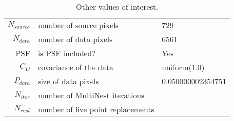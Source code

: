 \begin{table*}[!htb]\caption{Other values of interest.}\begin{center}\begin{tabular}{ r l l }\hline $N_{source}$ & number of source pixels           & 729 \\ 
 $N_{data}$   & number of data pixels             & 6561 \\ 
 PSF & is PSF included?                          & Yes \\
 $C_D$        & covariance of the data            & uniform(1.0) \\ 
 $P_{data}$   & size of data pixels               & 0.050000002354751 \\ 
 $N_{iter}$   & number of MultiNest iterations    &  \\ 
 $N_{repl}$   & number of live point replacements &  \\ 
\hline\end{tabular}\end{center}\label{tab:3}\end{table*}